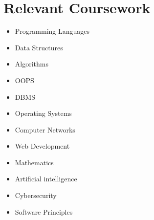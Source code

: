 \documentclass[letterpaper,11pt]{article}
\makeatletter
\newcommand{\resumeItem}[1]{
  \item\small{
    {#1 \vspace{-2pt}}
  }
}
\newcommand{\resumeSubheading}[4]{
  \vspace{-2pt}\item
    \begin{tabular*}{1.0\textwidth}[t]{l@{\extracolsep{\fill}}r}
      \textbf{#1} & \textbf{\small #2} \\
      \textit{\small#3} & \textit{\small #4} \\
    \end{tabular*}\vspace{-7pt}
}
\newcommand{\resumeSubHeadingListStart}{\begin{itemize}[leftmargin=0.0in, label={}]}
\newcommand{\resumeSubHeadingListEnd}{\end{itemize}}
\newcommand{\resumeItemListStart}{\begin{itemize}}
\newcommand{\resumeItemListEnd}{\end{itemize}\vspace{-5pt}}
\makeatother
\begin{document}
\section{Relevant Coursework}
        \begin{multicols}{4}
            \begin{itemize}[itemsep=-5pt, parsep=3pt]
                \item\small Programming Languages
                \item Data Structures
                \item Algorithms
                \item OOPS
                \item DBMS
                \item Operating Systems
                \item Computer Networks
                \item Web Development
                \item Mathematics
                \item Artificial intelligence
                \item Cybersecurity
                \item Software Principles  
            \end{itemize}
        \end{multicols}
        \vspace*{2.0\multicolsep}



\end{document}
